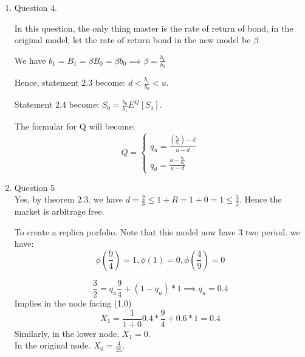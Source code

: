 \documentclass[]{book}
\theoremstyle{definition}
\begin{document}
\begin{enumerate}
\begin{proof}
From definition 2.4, we have: $S_0=s = \frac{1}{1+R}E^{Q}[S_1] = \frac{1}{1+R}\left[q_usu+q_dsd \right] =  \frac{1}{1+R}\left[q_usu+ (1-q_u)sd\right] = \frac{1}{1+R}\left[q_usu+ (1-q_u)sd\right] \implies 1+R = q_u(u-d) + d\implies q_u = \frac{(1+R)-d}{u-d}$.\\
Symmetric argument, $q_d = \frac{(u-1+R)}{u-d}$

\end{proof}

\begin{proof}
WLOG, suppose $X_1<X = \phi(Z)$ We can get "free money" by buying the contingentcy plan at price $X_1<\phi(Z)$ and recieve $\phi(Z)>X_1$
\end{proof}

\item Question 4.

In this question, the only thing master is the rate of return of bond, in the original model, let the rate of return bond in the new model be $\beta$.

We have $b_1=B_1 = \beta B_0 = \beta b_0 \implies  \beta = \frac{b_1}{b_0}$

Hence, statement 2.3 become: $d<\frac{b_1}{b_0}<u$.

Statement 2.4 become: $S_0= \frac{b_0}{b_1}E^{Q}[S_1]$.

The formular for Q will become:\\ 
\begin{equation*}
 Q = \left\{
        \begin{array}{ll}
            q_u = \frac{(\frac{b_1}{b_0})-d}{u-d}\\
            q_d = \frac{u-\frac{b_1}{b_0}}{u-d}
        \end{array}
    \right.
\end{equation*}
\item Question 5\\
Yes, by theorem 2.3. we have $d=\frac{2}{3} \leq 1+R =1+0=1 \leq \frac{3}{2}$. Hence the market is arbitrage free.

To create a replica porfolio. Note that this model now have 3 two period.
we have:
$$\phi(\frac{9}{4}) = 1, \phi(1) = 0 , \phi(\frac{4}{9})= 0$$


$$\frac{3}{2} = q_u \frac{9}{4} +(1-q_u)*1 \implies q_u = 0.4$$
Implies in the node facing (1,0) $$X_1 = \frac{1}{1+0}0.4 * \frac{9}{4} + 0.6*1 = 0.4$$
Similarly, in the lower node. $X_1 = 0$.\\
In the original node. $X_0 = \frac{4}{25}$.\\


\end{enumerate}
\end{document}
